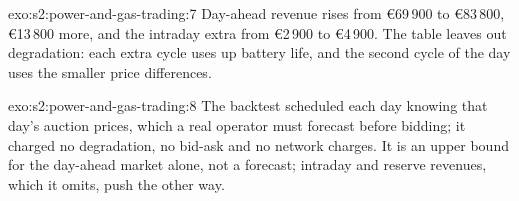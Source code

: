 \begin{solution}{exo:s2:power-and-gas-trading:7}
Day-ahead revenue rises from \euro69\,900 to \euro83\,800, \euro13\,800 more, and the intraday extra from \euro2\,900 to \euro4\,900. The table leaves out
degradation: each extra cycle uses up battery life, and the second cycle of the day uses the smaller price differences.
\end{solution}

\begin{solution}{exo:s2:power-and-gas-trading:8}
The backtest scheduled each day knowing that day's auction prices, which a real operator must forecast before bidding; it charged no degradation, no
bid-ask and no network charges. It is an upper bound for the day-ahead market alone, not a forecast; intraday and reserve revenues, which it omits,
push the other way.
\end{solution}

